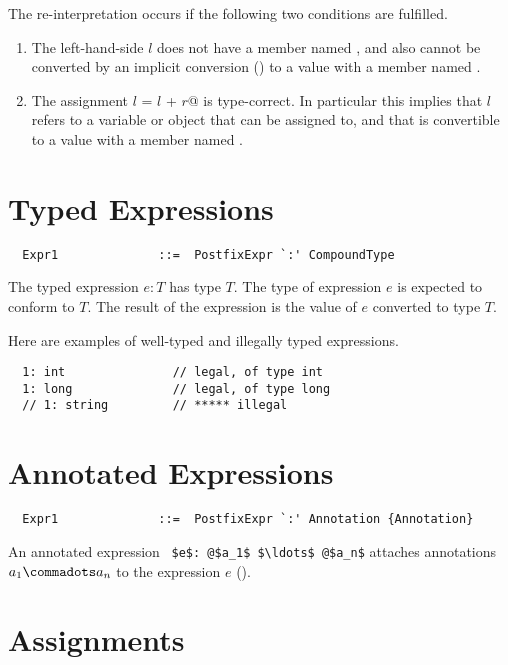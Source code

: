 The re-interpretation occurs if the following two conditions are fulfilled.
\begin{enumerate}
\item 
The left-hand-side $l$ does not have a member named
\code{+=}, and also cannot be converted by an implicit conversion ()
to a value with a member named \code{+=}.
\item
The assignment \lstinline@$l$ = $l$ + $r$@ is type-correct. 
In particular this implies that $l$ refers to a variable or object 
that can be assigned to, and that is convertible to a value with a member named \code{+}.
\end{enumerate}

\section{Typed Expressions}

\syntax\begin{lstlisting}
  Expr1              ::=  PostfixExpr `:' CompoundType
\end{lstlisting}

The typed expression $e: T$ has type $T$. The type of
expression $e$ is expected to conform to $T$. The result of
the expression is the value of $e$ converted to type $T$.

\example Here are examples of well-typed and illegally typed expressions.

\begin{lstlisting}
  1: int               // legal, of type int
  1: long              // legal, of type long
  // 1: string         // ***** illegal
\end{lstlisting}



\section{Annotated Expressions}

\syntax\begin{lstlisting}
  Expr1              ::=  PostfixExpr `:' Annotation {Annotation} 
\end{lstlisting}

An annotated expression ~\lstinline^$e$: @$a_1$ $\ldots$ @$a_n$^
attaches annotations $a_1 \commadots a_n$ to the expression $e$
().

\section{Assignments}\label{sec:assigments}

